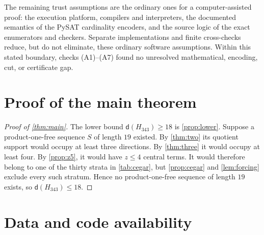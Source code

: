 \documentclass[11pt]{amsart}
\theoremstyle{definition}
\newcommand{\HH}{H_{343}}
\newcommand{\dd}{\mathsf d}
\begin{document}
The remaining trust assumptions are the ordinary ones for a
computer-assisted proof: the execution platform, compilers and
interpreters, the documented semantics of the PySAT cardinality
encoders, and the source logic of the exact enumerators and checkers.
Separate implementations and finite cross-checks reduce, but do not
eliminate, these ordinary software assumptions.  Within this stated
boundary, checks (A1)--(A7) found no unresolved mathematical, encoding,
cut, or certificate gap.

\section{Proof of the main theorem}

\begin{proof}[Proof of \cref{thm:main}]
The lower bound $\dd(\HH)\geq18$ is \cref{prop:lower}. Suppose a product-one-free sequence $S$ of length $19$ existed. By \cref{thm:two} its quotient support would occupy at least three directions. By \cref{thm:three} it would occupy at least four. By \cref{prop:z5}, it would have $z\leq4$ central terms. It would therefore belong to one of the thirty strata in \cref{tab:cegar}, but \cref{prop:cegar} and \cref{lem:forcing} exclude every such stratum. Hence no product-one-free sequence of length $19$ exists, so $\dd(\HH)\leq18$.
\end{proof}

\section*{Data and code availability}
\end{document}
